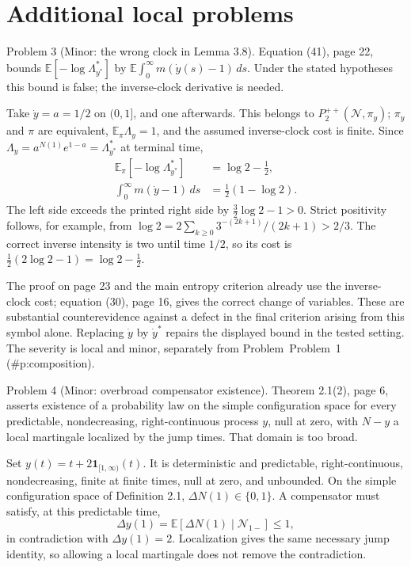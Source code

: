 \documentclass[10pt]{article}
\begin{document}
\section*{Additional local problems}
Problem 3 (Minor: the wrong clock in Lemma 3.8).  Equation (41), page 22, bounds \(\mathbb E[-\log\Lambda^*_{y^*}]\) by \(\mathbb E\int_0^\infty m(\dot y(s)-1)\,ds\). Under the stated hypotheses this bound is false; the inverse-clock derivative is needed.\par
Take \(\dot y=a=1/2\) on \((0,1]\), and one afterwards. This belongs to \(P_2^{++}(\mathcal N,\pi_y)\); \(\pi_y\) and \(\pi\) are equivalent, \(\mathbb E_\pi\Lambda_y=1\), and the assumed inverse-clock cost is finite. Since \(\Lambda_y=a^{N(1)}e^{1-a}=\Lambda^*_{y^*}\) at terminal time, \[\begin{aligned}
\mathbb E_\pi[-\log\Lambda^*_{y^*}]&=\log2-\tfrac12,\\
\int_0^\infty m(\dot y-1)\,ds&=\tfrac12(1-\log2).\end{aligned}\] The left side exceeds the printed right side by \(\tfrac32\log2-1>0\). Strict positivity follows, for example, from \(\log2=2\sum_{k\geq0}3^{-(2k+1)}/(2k+1)>2/3\). The correct inverse intensity is two until time \(1/2\), so its cost is \(\tfrac12(2\log2-1)=\log2-\tfrac12\).\par
The proof on page 23 and the main entropy criterion already use the inverse-clock cost; equation (30), page 16, gives the correct change of variables. These are substantial counterevidence against a defect in the final criterion arising from this symbol alone. Replacing \(\dot y\) by \(\dot y^*\) repairs the displayed bound in the tested setting. The severity is local and minor, separately from Problem Problem 1 (\#p:composition).\par
Problem 4 (Minor: overbroad compensator existence).  Theorem 2.1(2), page 6, asserts existence of a probability law on the simple configuration space for every predictable, nondecreasing, right-continuous process \(y\), null at zero, with \(N-y\) a local martingale localized by the jump times. That domain is too broad.\par
Set \(y(t)=t+2\mathbf1_{[1,\infty)}(t)\). It is deterministic and predictable, right-continuous, nondecreasing, finite at finite times, null at zero, and unbounded. On the simple configuration space of Definition 2.1, \(\Delta N(1)\in\{0,1\}\). A compensator must satisfy, at this predictable time, \[\Delta y(1)=\mathbb E[\Delta N(1)\mid\mathcal N_{1-}]\leq1,\] in contradiction with \(\Delta y(1)=2\). Localization gives the same necessary jump identity, so allowing a local martingale does not remove the contradiction.\par
\end{document}
